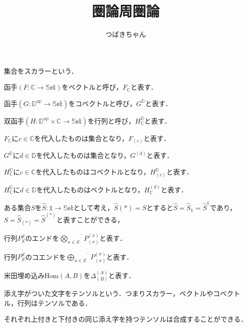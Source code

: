\documentclass[a4j,12pt]{jarticle}
\title{圏論周圏論}
\author{つばきちゃん}
\theoremstyle{definition}
\numberwithin{equation}{section}
\newcommand{\1}{\mathbb{1}}
\newcommand{\2}{\mathbb{2}}
\renewcommand{\.}{\hspace{2mm}}
\newcommand{\End}[1]{\overline{\bigotimes_{#1}}}
\newcommand{\CoEnd}[1]{\overline{\bigoplus_{#1}}}
\begin{document}
\maketitle
\newpage

\tableofcontents
\clearpage

集合をスカラーという．

函手$(F:\mathbb{C}\rightarrow\mathbb{Set})$をベクトルと呼び，$F_\mathbb{C}$と表す．

函手$(G:\mathbb{D^{op}}\rightarrow\mathbb{Set})$をコベクトルと呼び，$G^\mathbb{D}$と表す．

双函手$(H:\mathbb{D^{op}\times\mathbb{C}}\rightarrow\mathbb{Set})$を行列と呼び，$H^\mathbb{D}_\mathbb{C}$と表す．

$F_\mathbb{C}$に$c\in \mathbb{C}$を代入したものは集合となり，$F_{(c)}$と表す．

$G^\mathbb{D}$に$d\in \mathbb{D}$を代入したものは集合となり，$G^{(d)}$と表す．

$H_\mathbb{C}^\mathbb{D}$に$c\in \mathbb{C}$を代入したものはコベクトルとなり，$H_{(c)}^\mathbb{D}$と表す．

$H_\mathbb{C}^\mathbb{D}$に$d\in \mathbb{D}$を代入したものはベクトルとなり，$H_\mathbb{C}^{(d)}$と表す．

ある集合$S$を$\hat{S}:\mathbb{1}\rightarrow\mathbb{Set}$として考え，$\hat{S}(*)=S$とすると$\hat{S}=\hat{S}_\mathbb{1}=\hat{S}^\mathbb{1}$であり，$S=\hat{S}_{(*)}=\hat{S}^{(*)}$と表すことができる，

行列$P_\mathbb{X}^\mathbb{X}$のエンドを$\End{x \in \mathbb{X}} P_{(x)}^{(x)}$と表す．

行列$P_\mathbb{X}^\mathbb{X}$のコエンドを$\CoEnd{x \in \mathbb{X}} P_{(x)}^{(x)}$と表す．

米田埋め込み$\text{Hom}(A,B)$を$\Delta^{(A)}_{(B)}$と表す．

添え字がついた文字をテンソルという．つまりスカラー，ベクトルやコベクトル，行列はテンソルである．

それぞれ上付きと下付きの同じ添え字を持つテンソルは合成することができる．
\end{document}

